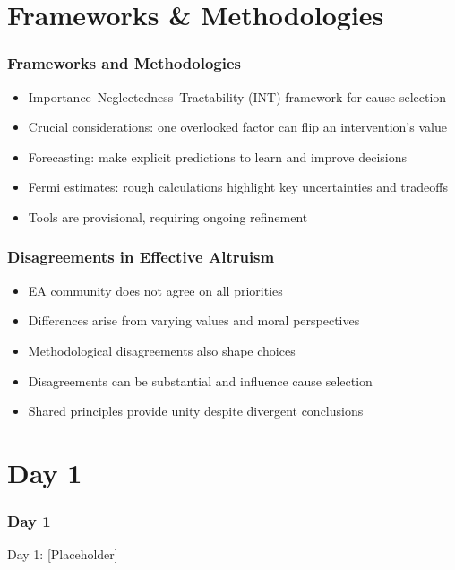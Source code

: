 \section{Frameworks \& Methodologies}

\begin{frame}[fragile]\frametitle{Frameworks and Methodologies}
      \begin{itemize}
        \item Importance–Neglectedness–Tractability (INT) framework for cause selection
        \item Crucial considerations: one overlooked factor can flip an intervention’s value
        \item Forecasting: make explicit predictions to learn and improve decisions
        \item Fermi estimates: rough calculations highlight key uncertainties and tradeoffs
        \item Tools are provisional, requiring ongoing refinement
      \end{itemize}
\end{frame}

\begin{frame}[fragile]\frametitle{Disagreements in Effective Altruism}
      \begin{itemize}
        \item EA community does not agree on all priorities
        \item Differences arise from varying values and moral perspectives
        \item Methodological disagreements also shape choices
        \item Disagreements can be substantial and influence cause selection
        \item Shared principles provide unity despite divergent conclusions
      \end{itemize}
\end{frame}
\section{Day 1}

\begin{frame}[fragile]\frametitle{Day 1}
\begin{center}
{\Large Day 1: [Placeholder]}
\end{center}
\end{frame}

